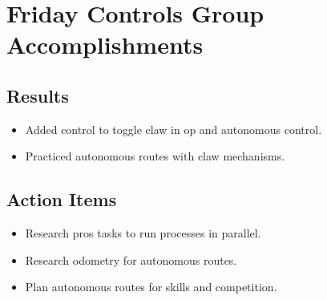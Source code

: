 \section{Friday Controls Group Accomplishments}

\subsection{Results}
\begin{itemize}
    \item Added control to toggle claw in op and autonomous control.
    \item Practiced autonomous routes with claw mechanisms.
\end{itemize}

\subsection{Action Items}
\begin{itemize}
    \item Research pros tasks to run processes in parallel.
    \item Research odometry for autonomous routes.
    \item Plan autonomous routes for skills and competition.
\end{itemize}